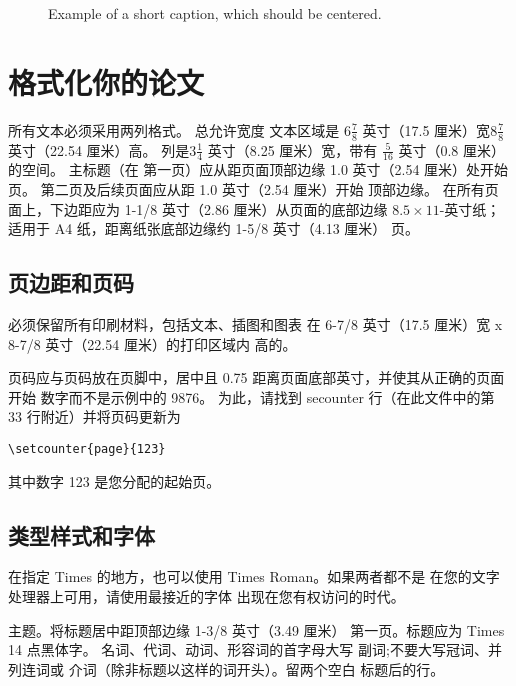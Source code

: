 \documentclass[10pt,letterpaper,a4paper]{article}
\begin{document}
\begin{sloppypar}
\begin{figure*}
\begin{center}
\fbox{\rule{0pt}{2in} \rule{.9\linewidth}{0pt}}
\end{center}
   \caption{Example of a short caption, which should be centered.}
\label{fig:short}
\end{figure*}

\section{格式化你的论文}
所有文本必须采用两列格式。 总允许宽度
文本区域是 $6\frac78$ 英寸（17.5 厘米）宽$8\frac78$ 英寸（22.54
厘米）高。 列是$3\frac14$ 英寸（8.25 厘米）宽，带有
$\frac{5}{16}$ 英寸（0.8 厘米）的空间。 主标题（在
第一页）应从距页面顶部边缘 1.0 英寸（2.54 厘米）处开始
页。 第二页及后续页面应从距 1.0 英寸（2.54 厘米）开始
顶部边缘。 在所有页面上，下边距应为 1-1/8 英寸（2.86
厘米）从页面的底部边缘 $8.5 \times 11$-英寸纸； 适用于 A4
纸，距离纸张底部边缘约 1-5/8 英寸（4.13 厘米）
页。

\subsection{页边距和页码}

必须保留所有印刷材料，包括文本、插图和图表
在 6-7/8 英寸（17.5 厘米）宽 x 8-7/8 英寸（22.54 厘米）的打印区域内
高的。

页码应与页码放在页脚中，居中且 0.75
距离页面底部英寸，并使其从正确的页面开始
数字而不是示例中的 9876。 为此，请找到 secounter
行（在此文件中的第 33 行附近）并将页码更新为
\begin{verbatim}
\setcounter{page}{123}
\end{verbatim}
其中数字 123 是您分配的起始页。

\subsection{类型样式和字体}
在指定 Times 的地方，也可以使用 Times Roman。如果两者都不是
在您的文字处理器上可用，请使用最接近的字体
出现在您有权访问的时代。

主题。将标题居中距顶部边缘 1-3/8 英寸（3.49 厘米）
第一页。标题应为 Times 14 点黑体字。
名词、代词、动词、形容词的首字母大写
副词;不要大写冠词、并列连词或
介词（除非标题以这样的词开头）。留两个空白
标题后的行。


\end{sloppypar}
\end{document}
